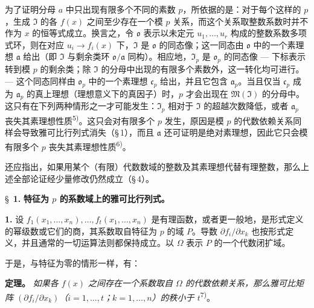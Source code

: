 为了证明分母 $a$ 中只出现有限多个不同的素数 $p$，所依据的是：对于每个这样的 $p$，生成 $\mathfrak{I}$ 的各 $f(x)$ 之间至少存在一个模 $p$ 关系，而这个关系取整数系数时并不作为 $x$ 的恒等式成立。换言之，令 $\mathfrak{o}$ 表示以未定元 $u_1,\ldots,u_r$ 构成的整数系数多项式环，则在对应 $u_i \to f_i(x)$ 下，$\mathfrak{I}$ 是 $\mathfrak{o}$ 的同态像；这一同态由 $\mathfrak{o}$ 中的一个素理想 $\mathfrak{a}$ 给出（即 $\mathfrak{I}$ 与剩余类环 $\mathfrak{o}/\mathfrak{a}$ 同构）。相应地，$\mathfrak{I}_p$ 是 $\mathfrak{o}_p$ 的同态像 --- 下标表示转到模 $p$ 的剩余类；除 $\mathfrak{I}$ 的分母中出现的有限多个素数外，这一转化均可进行。--- 这个同态同样由 $\mathfrak{o}_p$ 中的一个素理想 $\mathfrak{c}_p$ 给出，并且它包含 $\mathfrak{a}_p$。当且仅当 $\mathfrak{c}_p$ 成为 $\mathfrak{a}_p$ 的真上理想（理想意义下的真因子）时，$p$ 才会出现在 $\mathfrak{M}(\mathfrak{I})$ 的分母中。这只有在下列两种情形之一才可能发生：$\mathfrak{I}_p$ 相对于 $\mathfrak{I}$ 的超越次数降低，或者 $\mathfrak{a}_p$ 丧失其素理想性质\textsuperscript{5)}。这只会对有限多个 $p$ 发生，原因是模 $p$ 的代数依赖关系同样会导致雅可比行列式消失（\S\,1），而且 $\mathfrak{a}$ 还可证明是绝对素理想，因此它只会模有限多个 $p$ 丧失其素理想性质\textsuperscript{6)}。

还应指出，如果用某个（有限）代数数域的整数及其素理想代替有理整数，那么上述全部论证经少量修改仍然成立（\S\,4）。

\bigskip
\S~\textbf{1.}
\textbf{特征为 $p$ 的系数域上的雅可比行列式。}

\smallskip

\noindent\textbf{1.}
设 $f_1(x_1,\ldots,x_n),\ldots,f_t(x_1,\ldots,x_n)$ 是有理函数，或者更一般地，是形式定义的幂级数或它们的商，其系数取自特征为 $p$ 的域 $P$。导数 $\partial f_i/\partial x_k$ 也按形式定义，并且通常的一切运算法则都保持成立。以 $\Omega$ 表示 $P$ 的一个代数闭扩域。

于是，与特征为零的情形一样，有：

\noindent\textbf{定理。}
\textit{如果各 $f(x)$ 之间存在一个系数取自 $\Omega$ 的代数依赖关系，那么雅可比矩阵 $(\partial f_i/\partial x_k)$（$i=1,\ldots,t$；$k=1,\ldots,n$）的秩小于 $t$}\textsuperscript{7)}。

